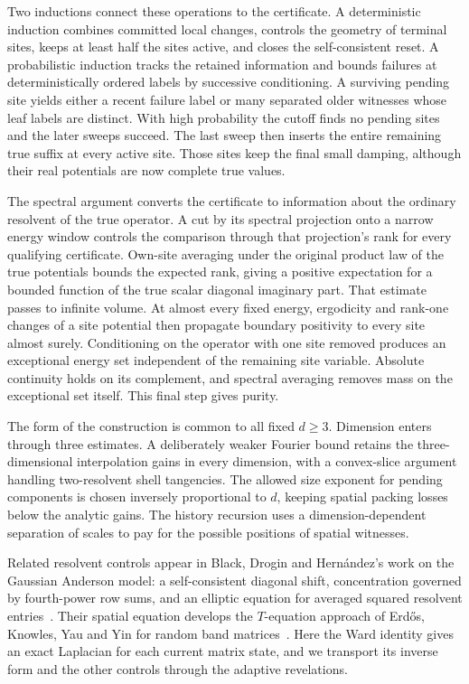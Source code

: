 Two inductions connect these operations to the certificate. A
deterministic induction combines committed local changes, controls the
geometry of terminal sites, keeps at least half the sites active, and
closes the self-consistent reset. A probabilistic induction tracks the
retained information and bounds failures at deterministically ordered
labels by successive conditioning. A surviving pending site yields
either a recent failure label or many separated older witnesses whose
leaf labels are distinct. With high probability the cutoff finds no
pending sites and the later
sweeps succeed. The last sweep then inserts the entire remaining true
suffix at every active site. Those sites keep the final small damping,
although their real potentials are now complete true values.

The spectral argument converts the certificate to information about
the ordinary resolvent of the true operator. A cut by its spectral
projection onto a narrow energy window controls the comparison through
that projection's rank for every qualifying certificate. Own-site
averaging under the original product law of the true potentials bounds
the expected rank, giving a positive expectation for a bounded function of the true
scalar diagonal imaginary part. That estimate passes to infinite
volume. At almost every fixed energy, ergodicity and rank-one changes
of a site potential then propagate boundary positivity to every site
almost surely. Conditioning on the operator with one site removed
produces an exceptional energy set independent of the remaining site
variable. Absolute continuity holds on its complement, and spectral
averaging removes mass on the exceptional set itself. This final step
gives purity.

The form of the construction is common to all fixed $d\ge3$.
Dimension enters through three estimates. A deliberately weaker
Fourier bound retains the three-dimensional interpolation gains in
every dimension, with a convex-slice argument handling two-resolvent
shell tangencies. The allowed size exponent for pending components
is chosen inversely proportional to $d$, keeping spatial packing
losses below the analytic gains. The history recursion uses a
dimension-dependent separation of scales to pay for the possible
positions of spatial witnesses.

Related resolvent controls appear in Black, Drogin and Hern\'andez's
work on the Gaussian Anderson model: a self-consistent diagonal shift,
concentration governed by fourth-power row sums, and an elliptic
equation for averaged squared resolvent
entries~\cite[Sections~1.1--1.2]{BlackDroginHernandez2025}.
Their spatial equation develops the $T$-equation approach of
Erd\H{o}s, Knowles, Yau and Yin for random band
matrices~\cite{ErdosKnowlesYauYin2013}. Here the Ward identity
gives an exact Laplacian for each current matrix state, and we transport
its inverse form and the other controls through the adaptive
revelations.

